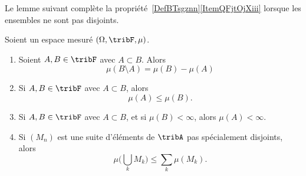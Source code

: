 Le lemme suivant complète la propriété~\ref{DefBTsgznn}\ref{ItemQFjtOjXiii} lorsque les ensembles ne sont pas disjoints.
\begin{lemma} \label{LemPMprYuC}
    Soient un espace mesuré \( (\Omega,\tribF,\mu)\).
    \begin{enumerate}
        \item       \label{ITEMooSUIRooNDVOoB}
            Soient \( A,B\in\tribF\) avec \( A\subset B\). Alors
    \begin{equation}
        \mu(B\setminus A)=\mu(B)-\mu(A)
    \end{equation}
\item       \label{ITEMooLEGKooWnYmlf}
        Si \( A,B\in \tribF\) avec \( A\subset B\), alors
    \begin{equation}
        \mu(A)\leq \mu(B).
    \end{equation}
\item           \label{ITEMooMCNBooRGVGqA}
        Si \( A,B\in \tribF\) avec \( A\subset B\), et si \( \mu(B)<\infty\), alors \( \mu(A)<\infty\).
\item       \label{ITEMooABPYooFQEzqE}
    Si \( (M_n)\) est une suite d'éléments de \( \tribA\) pas spécialement disjoints, alors
    \begin{equation}\label{EqWWFooYPCTt}
        \mu\big( \bigcup_kM_k \big)\leq \sum_{k}\mu(M_k).
    \end{equation}
    \end{enumerate}
\end{lemma}

